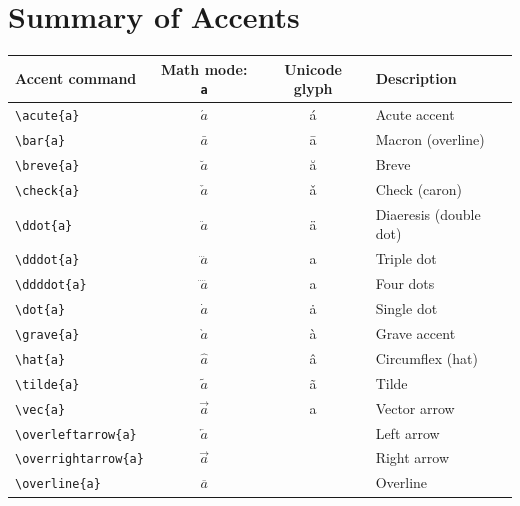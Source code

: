 \documentclass[12pt,a4paper]{article}
\begin{document}
\section*{Summary of Accents}

\begin{tabular}{|l|c|c|l|}
\hline
\textbf{Accent command}    & \textbf{Math mode: \texttt{a}}   & \textbf{Unicode glyph}   & \textbf{Description} \\
\hline
\verb|\acute{a}|           & $\acute{a}$                      & á                        & Acute accent \\
\verb|\bar{a}|             & $\bar{a}$                        & ā                        & Macron (overline) \\
\verb|\breve{a}|           & $\breve{a}$                      & ă                        & Breve \\
\verb|\check{a}|           & $\check{a}$                      & ǎ                        & Check (caron) \\
\verb|\ddot{a}|            & $\ddot{a}$                       & ä                        & Diaeresis (double dot) \\
\verb|\dddot{a}|           & $\dddot{a}$                      & a⃛                        & Triple dot \\
\verb|\ddddot{a}|          & $\ddddot{a}$                     & a⃜                        & Four dots \\
\verb|\dot{a}|             & $\dot{a}$                        & ȧ                        & Single dot \\
\verb|\grave{a}|           & $\grave{a}$                      & à                        & Grave accent \\
\verb|\hat{a}|             & $\hat{a}$                        & â                        & Circumflex (hat) \\
\verb|\tilde{a}|           & $\tilde{a}$                      & ã                        & Tilde \\
\verb|\vec{a}|             & $\vec{a}$                        & a⃗                        & Vector arrow \\
\verb|\overleftarrow{a}|   & $\overleftarrow{a}$              &                          & Left arrow \\
\verb|\overrightarrow{a}|  & $\overrightarrow{a}$             &                          & Right arrow \\
\verb|\overline{a}|        & $\overline{a}$                   &                          & Overline \\

\end{tabular}
\end{document}

